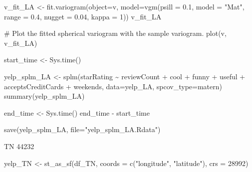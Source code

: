 \documentclass[
  12pt,
  letterpaper,
  DIV=11,
  numbers=noendperiod]{scrartcl}
\newenvironment{Shaded}{\begin{snugshade}}{\end{snugshade}}
\newcommand{\AttributeTok}[1]{\textcolor[rgb]{0.98,0.46,0.51}{#1}}
\newcommand{\CommentTok}[1]{\textcolor[rgb]{0.42,0.45,0.49}{#1}}
\newcommand{\DecValTok}[1]{\textcolor[rgb]{0.47,0.72,1.00}{#1}}
\newcommand{\FloatTok}[1]{\textcolor[rgb]{0.47,0.72,1.00}{#1}}
\newcommand{\FunctionTok}[1]{\textcolor[rgb]{0.70,0.57,0.94}{#1}}
\newcommand{\NormalTok}[1]{\textcolor[rgb]{0.88,0.89,0.91}{#1}}
\newcommand{\OtherTok}[1]{\textcolor[rgb]{0.70,0.57,0.94}{#1}}
\newcommand{\SpecialCharTok}[1]{\textcolor[rgb]{0.47,0.72,1.00}{#1}}
\newcommand{\StringTok}[1]{\textcolor[rgb]{0.62,0.80,1.00}{#1}}
\begin{document}
\begin{Shaded}
\begin{Highlighting}[]
\NormalTok{v\_fit\_LA }\OtherTok{\textless{}{-}} \FunctionTok{fit.variogram}\NormalTok{(}\AttributeTok{object=}\NormalTok{v, }
                           \AttributeTok{model=}\FunctionTok{vgm}\NormalTok{(}\AttributeTok{psill =} \FloatTok{0.1}\NormalTok{, }\AttributeTok{model =} \StringTok{"Mat"}\NormalTok{, }
                                     \AttributeTok{range =} \FloatTok{0.4}\NormalTok{, }\AttributeTok{nugget =} \FloatTok{0.04}\NormalTok{, }\AttributeTok{kappa =} \DecValTok{1}\NormalTok{))}
\NormalTok{v\_fit\_LA}

\CommentTok{\# Plot the fitted spherical variogram with the sample variogram.}
\FunctionTok{plot}\NormalTok{(v, v\_fit\_LA)}
\end{Highlighting}
\end{Shaded}

\begin{Shaded}
\begin{Highlighting}[]
\NormalTok{start\_time }\OtherTok{\textless{}{-}} \FunctionTok{Sys.time}\NormalTok{()}


\NormalTok{yelp\_splm\_LA }\OtherTok{\textless{}{-}} \FunctionTok{splm}\NormalTok{(starRating }\SpecialCharTok{\textasciitilde{}}\NormalTok{ reviewCount }\SpecialCharTok{+}\NormalTok{ cool }\SpecialCharTok{+}\NormalTok{ funny }\SpecialCharTok{+}\NormalTok{ useful }\SpecialCharTok{+}\NormalTok{ acceptsCreditCards }\SpecialCharTok{+}\NormalTok{ weekends, }\AttributeTok{data=}\NormalTok{yelp\_LA, }\AttributeTok{spcov\_type=}\StringTok{\textquotesingle{}matern\textquotesingle{}}\NormalTok{)}
\FunctionTok{summary}\NormalTok{(yelp\_splm\_LA)}

\NormalTok{end\_time }\OtherTok{\textless{}{-}} \FunctionTok{Sys.time}\NormalTok{()}
\NormalTok{end\_time }\SpecialCharTok{{-}}\NormalTok{ start\_time}
\end{Highlighting}
\end{Shaded}

\begin{Shaded}
\begin{Highlighting}[]
\FunctionTok{save}\NormalTok{(yelp\_splm\_LA, }\AttributeTok{file=}\StringTok{"yelp\_splm\_LA.Rdata"}\NormalTok{)}
\end{Highlighting}
\end{Shaded}

TN 44232

\begin{Shaded}
\begin{Highlighting}[]
\NormalTok{yelp\_TN }\OtherTok{\textless{}{-}} \FunctionTok{st\_as\_sf}\NormalTok{(df\_TN, }\AttributeTok{coords =} \FunctionTok{c}\NormalTok{(}\StringTok{"longitude"}\NormalTok{, }\StringTok{"latitude"}\NormalTok{), }\AttributeTok{crs =} \DecValTok{28992}\NormalTok{)}
\end{Highlighting}
\end{Shaded}
\end{document}
